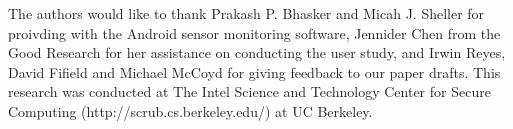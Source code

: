 \begin{acks}
The authors would like to thank Prakash P. Bhasker and Micah J. Sheller for proivding with the Android sensor monitoring software, Jennider Chen from the Good Research for her assistance on conducting the user study, and Irwin Reyes, David Fifield and Michael McCoyd for giving feedback to our paper drafts.
This research was conducted at The Intel Science and Technology Center for Secure Computing (http://scrub.cs.berkeley.edu/) at UC Berkeley.
\end{acks}
